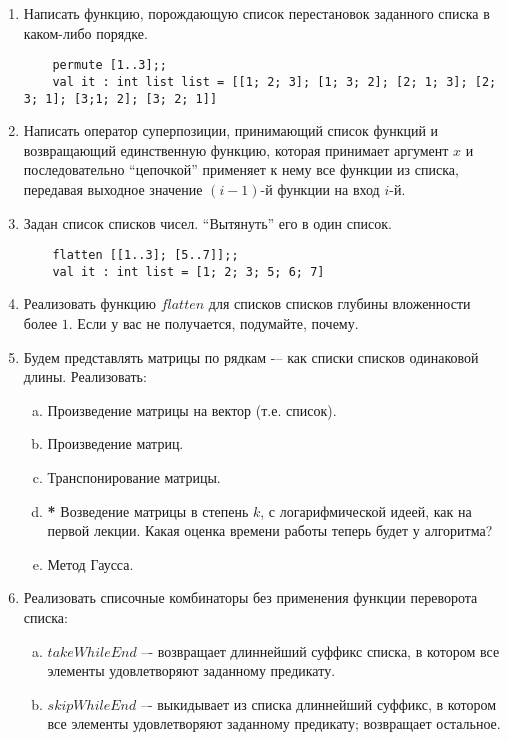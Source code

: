 \documentclass[a4paper,11pt]{article}
\begin{document}
\begin{enumerate}[{2-}1]
\item Написать функцию, порождающую список перестановок заданного списка в 
  каком-либо порядке.
  \begin{lstlisting}
    permute [1..3];;
    val it : int list list = [[1; 2; 3]; [1; 3; 2]; [2; 1; 3]; [2; 3; 1]; [3;1; 2]; [3; 2; 1]]
  \end{lstlisting}

\item Написать оператор суперпозиции, принимающий список функций и возвращающий
  единственную функцию, которая принимает аргумент $x$ и последовательно
  ``цепочкой'' применяет к нему все функции из списка, передавая выходное 
  значение $(i-1)$-й функции на вход $i$-й.
  
\item Задан список списков чисел. ``Вытянуть'' его в один список.
  \begin{lstlisting}
    flatten [[1..3]; [5..7]];;
    val it : int list = [1; 2; 3; 5; 6; 7]
  \end{lstlisting}
  
\item Реализовать функцию $flatten$ для списков списков глубины вложенности
  более $1$. Если у вас не получается, подумайте, почему.

\item Будем представлять матрицы по рядкам -– как списки списков одинаковой 
  длины. Реализовать:
  \begin{enumerate}[(a)]
  \item Произведение матрицы на вектор (т.е. список).
  \item Произведение матриц.
  \item Транспонирование матрицы.
  \item \textbf{*} Возведение матрицы в степень $k$, с логарифмической идеей,
    как на первой лекции. Какая оценка времени работы теперь будет у алгоритма?
  \item  Метод Гаусса.
  \end{enumerate}
  
\item Реализовать списочные комбинаторы без применения функции переворота 
  списка:
  \begin{enumerate}[(a)]
  \item $takeWhileEnd$ –- возвращает длиннейший суффикс списка, в котором все
    элементы удовлетворяют заданному предикату.

  \item $skipWhileEnd$ –- выкидывает из списка длиннейший суффикс, в котором 
    все элементы удовлетворяют заданному предикату; возвращает остальное.
  \end{enumerate}
\end{enumerate}
\end{document}
